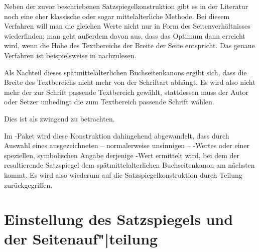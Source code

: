 \begin{Explain}
  Neben der zuvor beschriebenen Satzspiegelkonstruktion
  gibt es in der Literatur noch eine eher klassische oder sogar
  mittelalterliche Methode. Bei diesem Verfahren will man die gleichen Werte
  nicht nur in Form des Seitenverhältnisses wiederfinden; man geht außerdem
  davon aus, dass das Optimum dann erreicht wird, wenn die Höhe des
  Textbereichs der Breite der Seite entspricht. Das genaue Verfahren ist
  beispielsweise in \cite{JTsch87} nachzulesen.

  Als Nachteil dieses spätmittelalterlichen Buchseitenkanons ergibt sich, dass
  die Breite des Textbereichs nicht mehr von der Schriftart abhängt. Es wird
  also nicht mehr der zur Schrift passende Textbereich gewählt, stattdessen
  muss der Autor oder Setzer unbedingt die zum Textbereich passende Schrift
  wählen.
%
\iftrue
  Dies ist als zwingend zu betrachten.
\fi

  Im -Paket wird diese Konstruktion dahingehend abgewandelt,
  dass durch Auswahl eines ausgezeichneten -- normalerweise unsinnigen --
  -Wertes oder einer speziellen, symbolischen Angabe derjenige
  -Wert ermittelt wird, bei dem der resultierende Satzspiegel dem
  spätmittelalterlichen Buchseitenkanon am nächsten kommt. Es wird also
  wiederum auf die Satzspiegelkonstruktion durch Teilung zurückgegriffen.
%
\iffalse
  Bei Wahl einer guten Schrift stimmt dieses Ergebnis nicht selten mit der
  Suche nach dem optimalen \Var{DIV}-Wert überein. Siehe hierzu ebenfalls
  \autoref{sec:typearea.typearea}, \DescPageRef{typearea.option.DIV.calc}.
%
\fi
\end{Explain}



\section{Einstellung des Satzspiegels und der \texorpdfstring{Seitenauf"|teilung}{Seitenaufteilung}}

